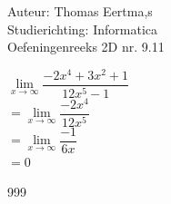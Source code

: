 \documentclass[a4paper]{article}
\begin{document}
  
\noindent \large Auteur: Thomas Eertma,s \\
\noindent \large Studierichting: Informatica\\
\noindent \large Oefeningenreeks 2D nr. 9.11\\

\medskip

\normalsize

$\lim\limits_{x\rightarrow\infty} \dfrac{-2x^4+3x^2+1}{12x^5-1}$ \\

$= \lim\limits_{x\rightarrow\infty} \dfrac{-2x^4}{12x^5}$ \\

$= \lim\limits_{x\rightarrow\infty} \dfrac{-1}{6x}$ \\

$= 0$

\begin{thebibliography}{999}
\end{thebibliography}
\end{document}
